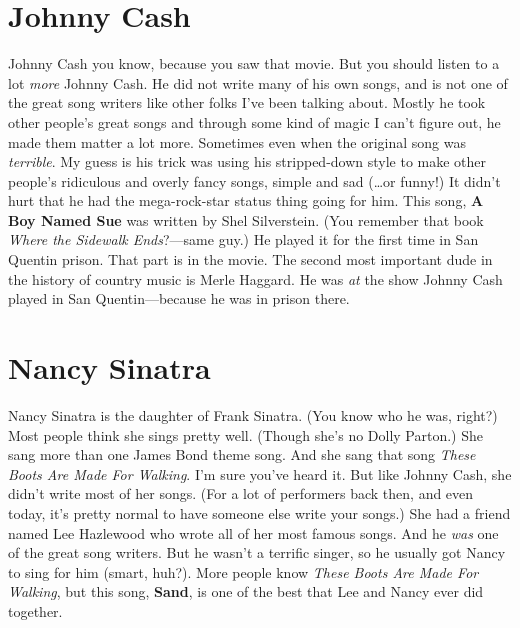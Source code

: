 \documentclass[letterpaper,single]{article}
\begin{document}
\section{Johnny Cash}
Johnny Cash you know, because you saw that movie. But you should listen
to a lot \emph{more} Johnny Cash. He did not write many of his own
songs, and is not one of the great song writers like other folks I've
been talking about. Mostly he took other people's great songs and
through some kind of magic I can't figure out, he made them matter a
lot more. Sometimes even when the original song was \emph{terrible}.
My guess is his trick was using his stripped-down style to make other
people's ridiculous and overly fancy songs, simple and sad (\ldots or
funny!) It didn't hurt that he had the mega-rock-star status thing
going for him. This song, \textbf{A Boy Named Sue} was written by
Shel Silverstein. (You remember that book \emph{Where the Sidewalk
Ends}?---same guy.) He played it for the first time in San Quentin
prison. That part is in the movie. The second most important dude in the
history of country music is Merle Haggard. He was \emph{at} the show
Johnny Cash played in San Quentin---because he was in prison there.

\section{Nancy Sinatra}
Nancy Sinatra is the daughter of Frank Sinatra. (You know who he was,
right?) Most people think she sings pretty well. (Though she's no Dolly
Parton.) She sang more than one James Bond theme song. And she sang that
song \emph{These Boots Are Made For Walking}. I'm sure you've heard it.
But like Johnny Cash, she didn't write most of her songs. (For a lot of
performers back then, and even today, it's pretty normal to have someone
else write your songs.) She had a friend named Lee Hazlewood who wrote
all of her most famous songs. And he \emph{was} one of the great song
writers. But he wasn't a terrific singer, so he usually got Nancy to
sing for him (smart, huh?). More people know \emph{These Boots Are Made
For Walking}, but this song, \textbf{Sand}, is one of the best that Lee
and Nancy ever did together.
\end{document}
